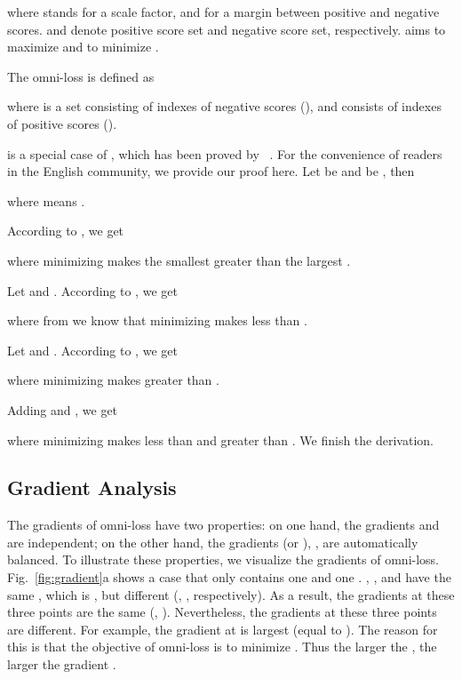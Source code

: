 \documentclass[paper_2425.tex]{subfiles}
\begin{document}
where  stands for a scale factor, and  for a margin between positive and negative scores.  and  denote positive score set and negative score set, respectively.
 aims to maximize  and to minimize .


The omni-loss is defined as

where  is a set consisting of indexes of negative scores (), and  consists of indexes of positive scores ().

 is a special case of , which has been proved by ~\cite{su2020multilabelloss}. For the convenience of readers in the English community, we provide our proof here. Let  be  and  be , then

where  means .

According to , we get

where minimizing  makes the smallest  greater than the largest .

Let  and . According to , we get

where from  we know that minimizing  makes  less than .

Let  and . According to , we get

where minimizing  makes  greater than .

Adding  and , we get

where minimizing  makes  less than  and  greater than .
We finish the derivation.


\subsection{Gradient Analysis}
\label{sec:gradients}

The gradients of omni-loss have two properties: on one hand, the gradients \wrt  and  are independent; on the other hand, the gradients \wrt  (or ), , are automatically balanced. To illustrate these properties, we visualize the gradients of omni-loss. Fig.~\ref{fig:gradient}a shows a case that only contains one  and one . , , and  have the same , which is , but different  (\ie, , respectively). As a result, the gradients \wrt  at these three points are the same (\ie, ). Nevertheless, the gradients \wrt  at these three points are different. For example, the gradient \wrt  at  is largest (equal to ).  The reason for this is that the objective of omni-loss is to minimize . Thus the larger the , the larger the gradient \wrt .
\end{document}

